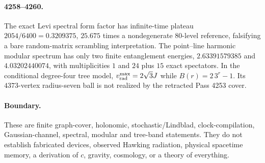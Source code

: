 \paragraph{4258--4260.} The exact Levi spectral form factor has infinite-time plateau $2054/6400=0.3209375$, $25.675$ times a nondegenerate $80$-level reference, falsifying a bare random-matrix scrambling interpretation.  The point--line harmonic modular spectrum has only two finite entanglement energies, $2.63391579385$ and $4.03202440074$, with multiplicities $1$ and $24$ plus $15$ exact spectators.  In the conditional degree-four tree model, $v_{\rm rad}^{\max}=2\sqrt3J$ while $B(r)=2\,3^r-1$.  Its $4373$-vertex radius-seven ball is not realized by the retracted Pass 4253 cover.
\paragraph{Boundary.} These are finite graph-cover, holonomic, stochastic/Lindblad, clock-compilation, Gaussian-channel, spectral, modular and tree-band statements.  They do not establish fabricated devices, observed Hawking radiation, physical spacetime memory, a derivation of $c$, gravity, cosmology, or a theory of everything.
